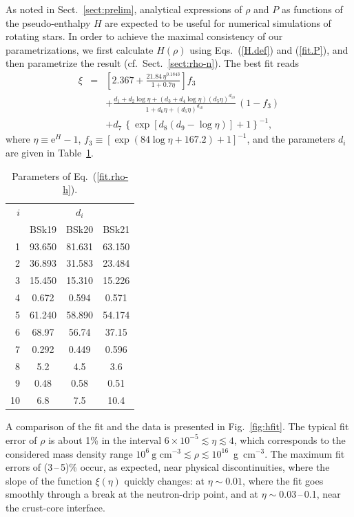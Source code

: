 \documentclass{aa}
\newcommand{\gcc}{\mbox{g cm$^{-3}$}}
\newcommand{\req}[1]{Eq.~(\ref{#1})}
\begin{document}
As noted in Sect.~\ref{sect:prelim}, analytical expressions
of $\rho$ and $P$ as functions of the pseudo-enthalpy $H$
are expected to be useful for numerical simulations of
rotating stars. In order to achieve the  maximal consistency
of our parametrizations, we first calculate $H(\rho)$ using
Eqs.~(\ref{H.def}) and (\ref{fit.P}), and then parametrize
the result (cf.~Sect.~\ref{sect:rho-n}). The best fit reads
\begin{eqnarray}
  \xi &=& \left[ 2.367+ \frac{21.84\,\eta^{0.1843}}{1+0.7\eta}
       \right] f_3
\nonumber\\&&
     +  \frac{d_1+d_2\log\eta+(d_3+d_4\log\eta)(d_5\eta)^{d_{10}}
       }{
        1+d_6\eta+(d_5\eta)^{d_{10}}}\,(1-f_3)
\nonumber\\&&
     +  d_7\,\left\{\exp\left[d_8
                 (d_9-\log\eta)\right]+1\right\}^{-1},
\label{fit.rho-h}
\end{eqnarray}
where  $\eta\equiv \mathrm{e}^H-1$,
$f_3 \equiv
\left[\exp(84\log\eta+167.2)+1\right]^{-1}$,
and the parameters $d_i$ are given in Table~\ref{tab:fit.rho-h}.

\begin{table}
\centering
\caption[]{Parameters of \req{fit.rho-h}.}
\label{tab:fit.rho-h}
\begin{tabular}{r|ccc}
\hline\hline\rule[-1.4ex]{0pt}{4.3ex}
$i$ & \multicolumn{3}{c}{$d_i$}\\
  & BSk19 & BSk20 & BSk21  \\
\hline\rule{0pt}{2.7ex}
1  & 93.650 & 81.631 & 63.150 \\
2  & 36.893 & 31.583 & 23.484 \\
3  & 15.450 & 15.310 & 15.226 \\
4  & 0.672 &   0.594 &   0.571 \\
5  & 61.240 & 58.890 & 54.174 \\
6  & 68.97 &  56.74 &  37.15 \\
7  & 0.292 &   0.449 &   0.596 \\
8  & 5.2 &    4.5 &    3.6 \\
9  & 0.48 &    0.58 &    0.51 \\
10 & 6.8 &    7.5 &    10.4 \\
\hline\hline
\end{tabular}
\end{table}

A comparison of the fit and the data is presented  in
Fig.~\ref{fig:hfit}. The typical fit error of $\rho$ is
about 1\% in the interval
$6\times10^{-5}\lesssim\eta\lesssim4$, which corresponds to
the considered mass density range
$10^6~\gcc\lesssim\rho\lesssim10^{16}$~\gcc. The maximum fit
errors of (3\,--\,5)\% occur, as expected, near physical
discontinuities, where the slope of the function $\xi(\eta)$
quickly changes: at  $\eta\sim0.01$, where the fit goes
smoothly through a break at the neutron-drip point, and at
$\eta\sim0.03$\,--\,0.1, near the crust-core interface.
\end{document}
